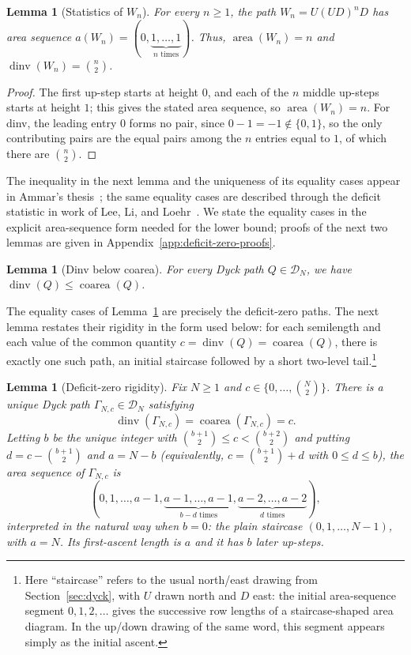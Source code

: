 \documentclass[11pt]{article}
\newtheorem{lemma}[theorem]{Lemma}
\theoremstyle{definition}
\newcommand{\D}{\mathcal D}
\newcommand{\area}{\operatorname{area}}
\newcommand{\dinv}{\operatorname{dinv}}
\newcommand{\coarea}{\operatorname{coarea}}
\begin{document}
\begin{lemma}[Statistics of $W_n$]\label{lem:wrapped-flat-stats}
For every $n\ge1$, the path $W_n=U(UD)^nD$ has area sequence
$a(W_n)=(0,\underbrace{1,\ldots,1}_{n\text{ times}})$.  Thus,
$\area(W_n)=n$ and $\dinv(W_n)=\binom n2$.
\end{lemma}

\begin{proof}
The first up-step starts at height $0$, and each of the $n$ middle
up-steps starts at height $1$; this gives the stated area sequence, so
$\area(W_n)=n$.  For dinv, the leading entry $0$ forms no pair, since
$0-1=-1\notin\{0,1\}$, so the only contributing pairs are the equal pairs
among the $n$ entries equal to $1$, of which there are $\binom n2$.
\end{proof}

The inequality in the next lemma and the uniqueness of its equality cases
appear in Ammar's thesis~\cite{Ammar2015}; the same equality cases are
described through the deficit statistic in work of Lee, Li, and
Loehr~\cite{LeeLiLoehr2018}.  We state the equality cases in the explicit
area-sequence form needed for the lower bound; proofs of the next two lemmas
are given in Appendix~\ref{app:deficit-zero-proofs}.

\begin{lemma}[Dinv below coarea]\label{lem:dinv-coarea}
For every Dyck path $Q\in\D_N$, we have $\dinv(Q)\le\coarea(Q)$.
\end{lemma}

The equality cases of Lemma~\ref{lem:dinv-coarea} are precisely the
deficit-zero paths.  The next lemma restates their rigidity in the form used
below: for each semilength and each value of the common quantity
$c=\dinv(Q)=\coarea(Q)$, there is exactly one such path, an initial staircase
followed by a short two-level tail.\footnote{Here ``staircase'' refers to the
usual north/east drawing from Section~\ref{sec:dyck}, with $U$ drawn north and
$D$ east: the initial area-sequence segment $0,1,2,\ldots$ gives the successive
row lengths of a staircase-shaped area diagram.  In the up/down drawing of the
same word, this segment appears simply as the initial ascent.}

\begin{lemma}[Deficit-zero rigidity]\label{lem:deficit-zero-targets}
Fix $N\ge 1$ and $c\in\{0,\ldots,\binom N2\}$.  There is a unique Dyck path
$\Gamma_{N,c}\in\D_N$ satisfying
\[
   \dinv(\Gamma_{N,c})=\coarea(\Gamma_{N,c})=c.
\]
Letting $b$ be the unique integer with
$\binom{b+1}{2}\le c<\binom{b+2}{2}$ and putting $d=c-\binom{b+1}{2}$ and
$a=N-b$ (equivalently, $c=\binom{b+1}{2}+d$ with $0\le d\le b$), the area sequence
of $\Gamma_{N,c}$ is
\[
   (0,1,\ldots,a-1,
     \underbrace{a-1,\ldots,a-1}_{b-d\text{ times}},
     \underbrace{a-2,\ldots,a-2}_{d\text{ times}}),
\]
interpreted in the natural way when $b=0$: the plain staircase
$(0,1,\ldots,N-1)$, with $a=N$.  Its first-ascent length is $a$
and it has $b$ later up-steps.
\end{lemma}
\end{document}
